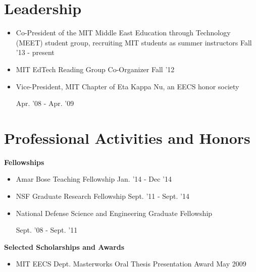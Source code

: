 \documentclass[margin]{res}
\begin{document}
\begin{resume}
\section{Leadership}
                \begin{itemize} \itemsep -2pt
                \item Co-President of the MIT Middle East Education through Technology (MEET) student group, recruiting MIT students as summer instructors \hfill Fall '13 - present
		\item MIT EdTech Reading Group Co-Organizer \hfill Fall '12 
                \item Vice-President, MIT Chapter of Eta Kappa Nu, an EECS honor society 
\begin{flushright}
Apr. '08 - Apr. '09
\end{flushright}      
\end{itemize}

\section{Professional Activities and Honors} 

               {\bf Fellowships}  
                \begin{itemize} \itemsep -2pt
\item Amar Bose Teaching Fellowship \hfill Jan. '14 - Dec '14
\item NSF Graduate Research Fellowship \hfill Sept. '11 - Sept. '14
              \item National Defense Science and Engineering Graduate Fellowship
\begin{flushright}
Sept. '08 - Sept. '11
\end{flushright}       
          
               \end{itemize}

{\bf Selected Scholarships and Awards}
                   \begin{itemize} \itemsep -2pt
\item MIT EECS Dept. Masterworks Oral Thesis Presentation Award \hfill May 2009   
                

\end{itemize}
\end{resume}
\end{document}
